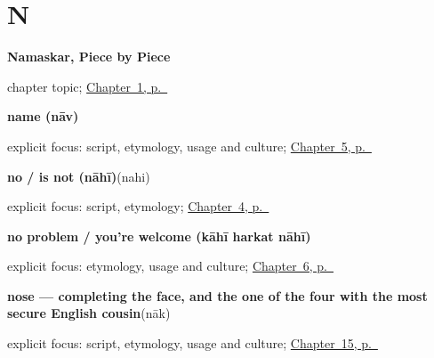 \section*{N}

\noindent\begin{minipage}[t]{\linewidth}
\raggedright
\textbf{Namaskar, Piece by Piece}\par
\footnotesize chapter topic; \hyperref[ch:first-greeting-script]{Chapter~1, p.~\pageref*{ch:first-greeting-script}}
\end{minipage}\par\smallskip

\noindent\begin{minipage}[t]{\linewidth}
\raggedright
\textbf{name (nāv)}\enspace\emph{}\par
\footnotesize explicit focus: script, etymology, usage and culture; \hyperref[ch:introductions]{Chapter~5, p.~\pageref*{ch:introductions}}
\end{minipage}\par\smallskip

\noindent\begin{minipage}[t]{\linewidth}
\raggedright
\textbf{no / is not (nāhī)}\enspace\emph{}\enspace(nahi)\par
\footnotesize explicit focus: script, etymology; \hyperref[ch:greetings]{Chapter~4, p.~\pageref*{ch:greetings}}
\end{minipage}\par\smallskip

\noindent\begin{minipage}[t]{\linewidth}
\raggedright
\textbf{no problem / you're welcome (kāhī harkat nāhī)}\enspace\emph{  }\par
\footnotesize explicit focus: etymology, usage and culture; \hyperref[ch:responding]{Chapter~6, p.~\pageref*{ch:responding}}
\end{minipage}\par\smallskip

\noindent\begin{minipage}[t]{\linewidth}
\raggedright
\textbf{nose — completing the face, and the one of the four with the most secure English cousin}\enspace\emph{}\enspace(nāk)\par
\footnotesize explicit focus: script, etymology, usage and culture; \hyperref[ch:mr-face-parts]{Chapter~15, p.~\pageref*{ch:mr-face-parts}}
\end{minipage}\par\smallskip

